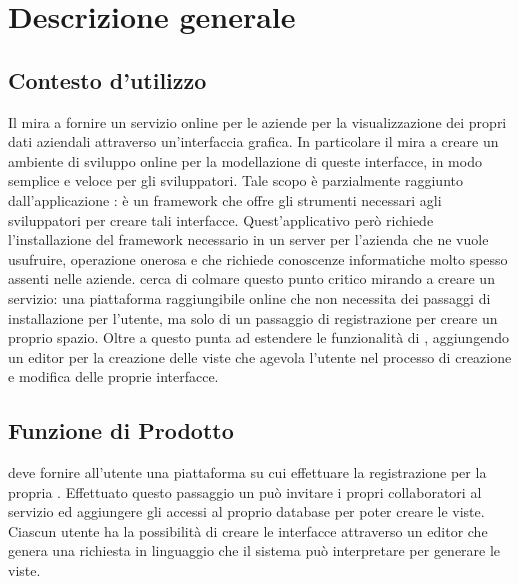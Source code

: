 \section{Descrizione generale}
\subsection{Contesto d'utilizzo}
Il   mira a fornire un servizio online per le aziende per la visualizzazione dei propri dati aziendali attraverso un'interfaccia grafica. In particolare il  mira a creare un ambiente di sviluppo online per la modellazione di queste interfacce, in modo semplice e veloce per gli sviluppatori.
Tale scopo è parzialmente raggiunto dall'applicazione : è un framework che offre gli strumenti necessari agli sviluppatori per creare tali interfacce. Quest'applicativo per\`o richiede l'installazione del framework necessario in un server per l'azienda che ne vuole usufruire, operazione onerosa e che richiede conoscenze informatiche molto spesso assenti nelle aziende.  cerca di colmare questo punto critico mirando a creare un servizio: una piattaforma raggiungibile online che non necessita dei passaggi di installazione per l'utente, ma solo di un passaggio di registrazione per creare un proprio spazio.
Oltre a questo  punta ad estendere le funzionalità di , aggiungendo un editor per la creazione delle viste che agevola l'utente nel processo di creazione e modifica delle proprie interfacce.


\subsection{Funzione di Prodotto}
 deve fornire all'utente una piattaforma su cui effettuare la registrazione per la propria . Effettuato questo passaggio un  pu\`o invitare i propri collaboratori al servizio ed aggiungere gli accessi al proprio database  per poter creare le viste.
Ciascun utente ha la possibilit\`a di creare le interfacce attraverso un editor che genera una richiesta in linguaggio  che il sistema può interpretare per generare le viste.

